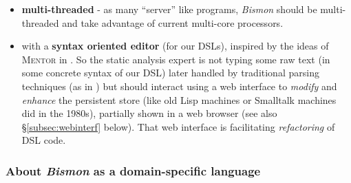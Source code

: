 \begin{itemize}
      \item \textbf{multi-threaded} - as many ``server'' like
        programs, \emph{Bismon} should be multi-threaded and take
        advantage of current multi-core processors.

      \item with a \textbf{syntax oriented editor} (for our DSLs),
        inspired by the ideas of \textsc{Mentor} in
        \cite{donzeaugouge:inria-mentor}. So the static analysis
        expert is not typing some raw text (in some concrete syntax of
        our DSL) later handled by traditional parsing techniques (as
        in \cite{Aho:2006:DragonBook}) but should interact using a web
        interface to \emph{modify} and \emph{enhance} the persistent
        store (like old Lisp machines or Smalltalk machines did in the
        1980s), partially shown in a web browser (see also
        §\ref{subsec:webinterf} below). That web interface is
        facilitating \emph{refactoring} of DSL code.
\end{itemize}


\subsubsection{About \emph{Bismon} as a domain-specific language}
\label{subsubsec:bismon-dsl}


